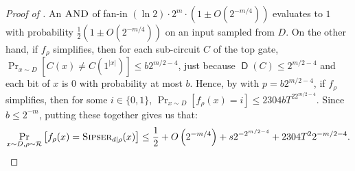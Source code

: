 \documentclass[11pt]{article}%
\newcommand{\Sipser}{\normalfont\textsc{Sipser}}
\newcommand{\AND}{\normalfont\textsc{AND}} %
\DeclareMathOperator{\D}{\mathsf{D}}
\begin{document}
\begin{proof}[Proof of ]
An $\AND$ of fan-in $(\ln 2) \cdot 2^m \cdot \left(1 \pm O\left(2^{-m/4}\right)\right)$ evaluates to $1$ with probability $\frac{1}{2}\left(1 \pm O\left(2^{-m/4}\right)\right)$ on an input sampled from $D$. On the other hand, if $f_\rho$ simplifies, then for each sub-circuit $C$ of the top gate, $\Pr_{x \sim D}\left[C(x) \neq C\left(1^{|x|}\right)\right] \le b2^{m/2-4}$, just because $\D(C) \le 2^{m/2-4}$ and each bit of $x$ is $0$ with probability at most $b$. Hence, by  with $p=b2^{m/2-4}$, if $f_\rho$ simplifies, then for some $i \in \{0,1\}$, $\Pr_{x \sim D}\left[f_\rho(x) = i\right] \le 2304bT^22^{m/2-4}$. Since $b \le 2^{-m}$, putting these together gives us that:
\[
\Pr_{x \sim D, \rho \sim \mathcal{R}}\left[f_\rho(x) = \Sipser_{d|\rho} (x)\right] \le \frac{1}{2} + O\left(2^{-m/4}\right) + s2^{-2^{m/2-4}} + 2304 T^22^{-m/2-4} .\qedhere
\]

\end{proof}
\end{document}

